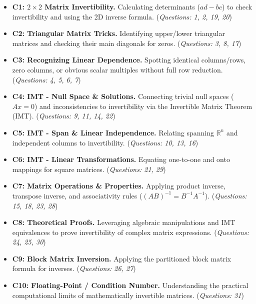 \documentclass[12pt]{article}
\begin{document}
\begin{itemize}
    \item \textbf{C1: $2 \times 2$ Matrix Invertibility.} Calculating determinants ($ad-bc$) to check invertibility and using the 2D inverse formula. (\textit{Questions: 1, 2, 19, 20})
    \item \textbf{C2: Triangular Matrix Tricks.} Identifying upper/lower triangular matrices and checking their main diagonals for zeros. (\textit{Questions: 3, 8, 17})
    \item \textbf{C3: Recognizing Linear Dependence.} Spotting identical columns/rows, zero columns, or obvious scalar multiples without full row reduction. (\textit{Questions: 4, 5, 6, 7})
    \item \textbf{C4: IMT - Null Space \& Solutions.} Connecting trivial null spaces ($Ax=0$) and inconsistencies to invertibility via the Invertible Matrix Theorem (IMT). (\textit{Questions: 9, 11, 14, 22})
    \item \textbf{C5: IMT - Span \& Linear Independence.} Relating spanning $\mathbb{R}^n$ and independent columns to invertibility. (\textit{Questions: 10, 13, 16})
    \item \textbf{C6: IMT - Linear Transformations.} Equating one-to-one and onto mappings for square matrices. (\textit{Questions: 21, 29})
    \item \textbf{C7: Matrix Operations \& Properties.} Applying product inverse, transpose inverse, and associativity rules ($(AB)^{-1} = B^{-1}A^{-1}$). (\textit{Questions: 15, 18, 23, 28})
    \item \textbf{C8: Theoretical Proofs.} Leveraging algebraic manipulations and IMT equivalences to prove invertibility of complex matrix expressions. (\textit{Questions: 24, 25, 30})
    \item \textbf{C9: Block Matrix Inversion.} Applying the partitioned block matrix formula for inverses. (\textit{Questions: 26, 27})
    \item \textbf{C10: Floating-Point / Condition Number.} Understanding the practical computational limits of mathematically invertible matrices. (\textit{Questions: 31})
\end{itemize}
\end{document}
